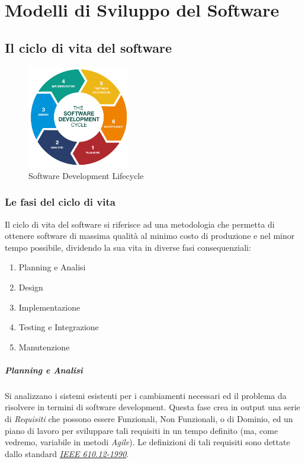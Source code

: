 \documentclass[a4paper,12pt]{report}
\begin{document}
	\chapter{Modelli di Sviluppo del Software}
	
		\section{Il ciclo di vita del software}
	
			\begin{figure}[h]
				\centering
				\includegraphics[width=0.4\textwidth]{sdlc}
				\caption{Software Development Lifecycle}
				\label{fig:sdlc}
			\end{figure}
	
			\subsection{Le fasi del ciclo di vita}
	
				Il ciclo di vita del software si riferisce ad una metodologia che permetta di ottenere software di massima qualità
				al minimo costo di produzione e nel minor tempo possibile, dividendo la sua vita in diverse fasi consequenziali:
				\begin{enumerate}
					\item Planning e Analisi
					\item Design
					\item Implementazione
					\item Testing e Integrazione
					\item Manutenzione
				\end{enumerate}
				
				\paragraph{Planning e Analisi}
				Si analizzano i sistemi esistenti per i cambiamenti necessari ed il problema da risolvere in termini di software development.
				Questa fase crea in output una serie di \emph{Requisiti} che possono essere Funzionali, Non Funzionali, o di Dominio, ed un piano
				di lavoro per sviluppare tali requisiti in un tempo definito (ma, come vedremo, variabile in metodi \emph{Agile}).
				Le definizioni di tali requisiti sono dettate dallo standard \href{https://standards.ieee.org/standard/610_12-1990.html}{\emph{IEEE 610.12-1990}}.
				
\end{document}
